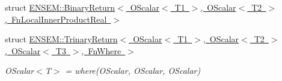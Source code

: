 \begin{DoxyCompactItemize}
struct \mbox{\hyperlink{structENSEM_1_1BinaryReturn_3_01OScalar_3_01T1_01_4_00_01OScalar_3_01T2_01_4_00_01FnLocalInnerProductReal_01_4}{E\+N\+S\+E\+M\+::\+Binary\+Return$<$ O\+Scalar$<$ T1 $>$, O\+Scalar$<$ T2 $>$, Fn\+Local\+Inner\+Product\+Real $>$}}
\item 
struct \mbox{\hyperlink{structENSEM_1_1TrinaryReturn_3_01OScalar_3_01T1_01_4_00_01OScalar_3_01T2_01_4_00_01OScalar_3_01T3_01_4_00_01FnWhere_01_4}{E\+N\+S\+E\+M\+::\+Trinary\+Return$<$ O\+Scalar$<$ T1 $>$, O\+Scalar$<$ T2 $>$, O\+Scalar$<$ T3 $>$, Fn\+Where $>$}}
\begin{DoxyCompactList}\small\item\em O\+Scalar$<$\+T$>$ = where(\+O\+Scalar, O\+Scalar, O\+Scalar) \end{DoxyCompactList}\end{DoxyCompactItemize}
